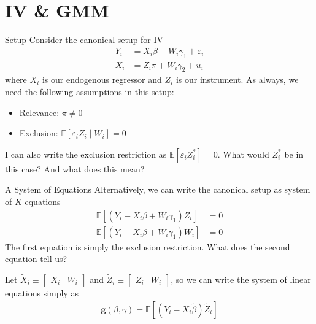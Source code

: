 \section{IV \& GMM}

\begin{frame}{Setup}
    Consider the canonical setup for IV
    \begin{align*}
        Y_i &= X_i \beta + W_i \gamma_1 + \varepsilon_i
        \\
        X_i &= Z_i \pi + W_i \gamma_2 + u_i
    \end{align*}
    where $X_i$ is our endogenous regressor and $Z_i$ is our instrument. As always, we need the following assumptions in this setup:
    \begin{itemize}
        \item Relevance: $\pi \neq 0$
        \item Exclusion: $\mathbb{E}[\varepsilon_i Z_i \mid W_i] = 0$
    \end{itemize}

    \vspace{2em}
    
    I can also write the exclusion restriction as $\mathbb{E}[\varepsilon_i Z_i^*] = 0$. What would $Z_i^*$ be in this case? And what does this mean?
\end{frame}

\begin{frame}{A System of Equations}
    Alternatively, we can write the canonical setup as system of $K$ equations
    \begin{align*}
        \mathbb{E}[(Y_i - X_i \beta + W_i \gamma_1) Z_i] &= 0
        \\
        \mathbb{E}[(Y_i - X_i \beta + W_i \gamma_1) W_i] &= 0
    \end{align*}
    The first equation is simply the exclusion restriction. What does the second equation tell us?

    \vspace{2em}
    
    Let $\tilde{X}_i \equiv \begin{bmatrix} X_i & W_i\end{bmatrix}$ and $\tilde{Z}_i \equiv \begin{bmatrix} Z_i & W_i \end{bmatrix}$, so we can write the system of linear equations simply as
    \begin{align*}
        \mathbf{g}(\beta, \gamma) = \mathbb{E}[(Y_i - \tilde{X}_i \tilde{\beta}) \tilde{Z}_i]
    \end{align*}
\end{frame}

